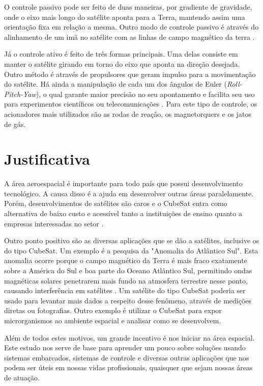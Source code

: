 \documentclass[
	12pt,				%
	openany,			%
	twoside,			%
	a4paper,			%
	english,			%
	french,				%
	spanish,			%
	brazil,				%
	oldfontcommands
	]{abntex2}
\begin{document}
O controle passivo pode ser feito de duas maneiras, por gradiente de gravidade, onde o eixo mais longo do satélite aponta para a Terra, mantendo assim uma orientação fixa em relação a mesma. Outro modo de controle passivo é através do alinhamento de um imã no satélite com as linhas de campo magnético da terra \cite{FrancLav}.

Já o controle ativo é feito de três formas principais. Uma delas consiste em manter o satélite girando em torno do eixo que aponta na direção desejada. Outro método é através de propulsores que geram impulso para a movimentação do satélite. Há ainda a manipulação de cada um dos ângulos de Euler (\textit{Roll-Pitch-Yaw}), o qual garante maior precisão no seu apontamento e facilita seu uso para experimentos científicos ou telecomunicações \cite{FrancLav}. Para este tipo de controle, os acionadores mais utilizados são as rodas de reação, os magnetorquers e os jatos de gás.

\section{Justificativa}

	A área aeroespacial é importante para todo país que possui desenvolvimento tecnológico. A causa disso é a ajuda em desenvolver outras áreas paralelamente. Porém, desenvolvimentos de satélites são caros e o CubeSat entra como alternativa de baixo custo e acessível tanto a instituições de ensino quanto a empresas interessadas no setor \cite{DIY}.
	
Outro ponto positivo são as diversas aplicações que se dão a satélites, inclusive os do tipo CubeSat. Um exemplo é a pesquisa da "Anomalia do Atlântico Sul". Esta anomalia ocorre porque o campo magnético da Terra é mais fraco exatamente sobre a América do Sul e boa parte do Oceano Atlântico Sul, permitindo ondas magnéticas solares penetrarem mais fundo na atmosfera terrestre nesse ponto, causando interferência em satélites \cite{MORAES}. Um satélite do tipo CubeSat poderia ser usado para levantar mais dados a respeito desse fenômeno, através de medições diretas ou fotografias. Outro exemplo é utilizar o CubeSat para expor microrganismos ao ambiente espacial e analisar como se desenvolvem.

Além de todos estes motivos, um grande incentivo é nos iniciar na área espacial. Este estudo nos serve de base para aprender um pouco sobre soluções usando sistemas embarcados, sistemas de controle e diversas outras aplicações que nos podem ser úteis em nossas vidas profissionais, quaisquer que sejam nossas áreas de atuação.
\end{document}
